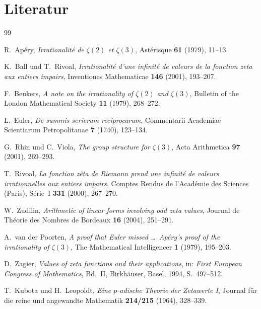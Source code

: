 \documentclass[12pt,a4paper]{amsart}
\theoremstyle{definition}
\theoremstyle{remark}
\begin{document}
\section{Literatur}

\begin{thebibliography}{99}

R.~Apéry,
\textit{Irrationalité de $\zeta(2)$ et $\zeta(3)$},
Astérisque \textbf{61} (1979), 11--13.

K.~Ball und T.~Rivoal,
\textit{Irrationalité d'une infinité de valeurs de la fonction zeta aux entiers impairs},
Inventiones Mathematicae \textbf{146} (2001), 193--207.

F.~Beukers,
\textit{A note on the irrationality of $\zeta(2)$ and $\zeta(3)$},
Bulletin of the London Mathematical Society \textbf{11} (1979), 268--272.

L.~Euler,
\textit{De summis serierum reciprocarum},
Commentarii Academiae Scientiarum Petropolitanae \textbf{7} (1740), 123--134.

G.~Rhin und C.~Viola,
\textit{The group structure for $\zeta(3)$},
Acta Arithmetica \textbf{97} (2001), 269--293.

T.~Rivoal,
\textit{La fonction zêta de Riemann prend une infinité de valeurs irrationnelles
aux entiers impairs},
Comptes Rendus de l'Académie des Sciences (Paris), Série~I \textbf{331} (2000),
267--270.

W.~Zudilin,
\textit{Arithmetic of linear forms involving odd zeta values},
Journal de Théorie des Nombres de Bordeaux \textbf{16} (2004), 251--291.

A.~van der Poorten,
\textit{A proof that Euler missed \ldots\ Apéry's proof of the irrationality of
$\zeta(3)$},
The Mathematical Intelligencer \textbf{1} (1979), 195--203.

D.~Zagier,
\textit{Values of zeta functions and their applications},
in: \textit{First European Congress of Mathematics}, Bd.~II,
Birkhäuser, Basel, 1994, S.~497--512.

T.~Kubota und H.~Leopoldt,
\textit{Eine $p$-adische Theorie der Zetawerte I},
Journal für die reine und angewandte Mathematik \textbf{214/215} (1964), 328--339.

\end{thebibliography}
\end{document}
